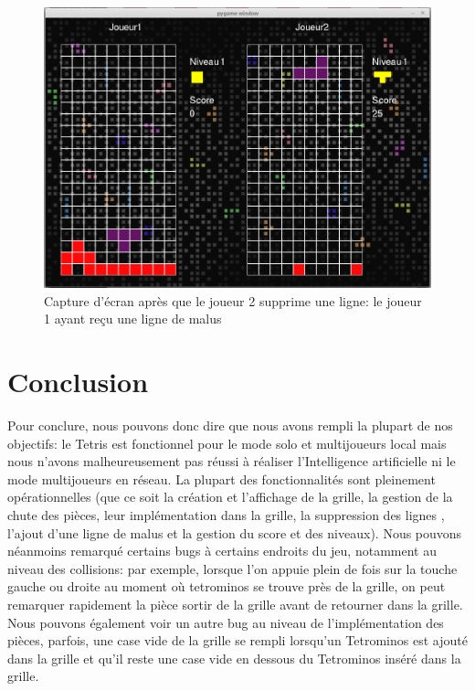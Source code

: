 \documentclass[a4paper, 11pt]{article}
\begin{document}
            \begin{figure}[ht]
                \centering
                \includegraphics[scale=0.25]{images/jeuM2.png}
                \caption{Capture d'écran après que le joueur 2 supprime une ligne: le joueur 1 ayant reçu une ligne de malus}
            \end{figure}
          
        
    \newpage
    \section{Conclusion}
            Pour conclure, nous pouvons donc dire que nous avons rempli la plupart de nos objectifs: le Tetris est fonctionnel pour le mode solo et multijoueurs local mais nous n'avons malheureusement pas réussi à réaliser l'Intelligence artificielle ni le mode multijoueurs en réseau. La plupart des fonctionnalités sont pleinement opérationnelles (que ce soit la création et l'affichage de la grille, la gestion de la chute des pièces, leur implémentation dans la grille, la suppression des lignes , l'ajout d'une ligne de malus et la gestion du score et des niveaux). Nous pouvons néanmoins remarqué certains bugs à certains endroits du jeu, notamment au niveau des collisions: par exemple, lorsque l'on appuie plein de fois sur la touche gauche ou droite au moment où tetrominos se trouve près de la grille, on peut remarquer rapidement la pièce sortir de la grille avant de retourner dans la grille. Nous pouvons également voir un autre bug au niveau de l'implémentation des pièces, parfois, une case vide de la grille se rempli lorsqu'un Tetrominos est ajouté dans la grille et qu'il reste une case vide en dessous du Tetrominos inséré dans la grille.
\end{document}
